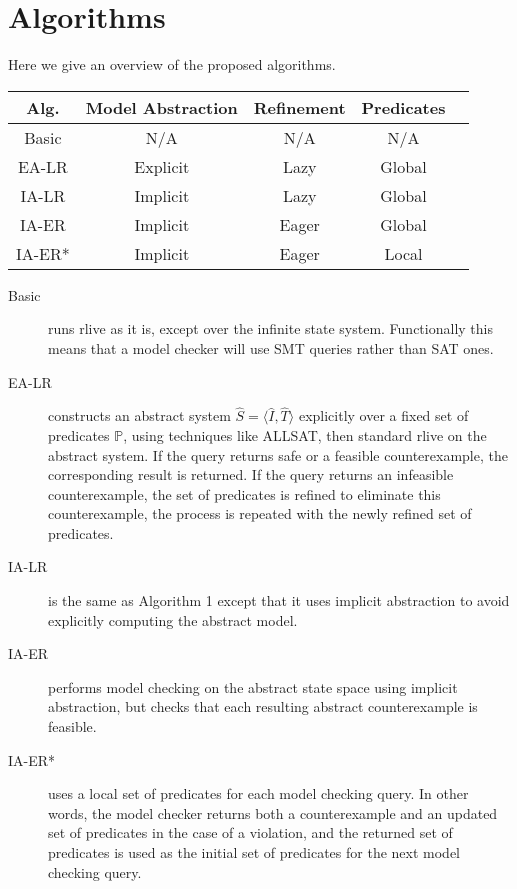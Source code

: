 \documentclass[runningheads]{llncs}
\newcommand{\rlive}{\textsf{rlive}\xspace}
\newcommand{\abs}[1]{\ensuremath{\widehat{#1}}}
\newcommand{\preds}{\ensuremath{\mathbb{P}}}
\begin{document}
\section{Algorithms}

Here we give an overview of the proposed algorithms.

\begin{table}[h]
\centering
\begin{tabular}{|c|c|c|c|c|}
\hline
\textbf{Alg.} & \textbf{Model Abstraction} & \textbf{Refinement} & \textbf{Predicates} \\ 
\hline \hline
Basic         & N/A                        & N/A                 & N/A                 \\ \hline
EA-LR         & Explicit                   & Lazy                & Global              \\ \hline
IA-LR         & Implicit                   & Lazy                & Global              \\ \hline
IA-ER         & Implicit                   & Eager               & Global              \\ \hline
IA-ER*        & Implicit                   & Eager               & Local               \\ \hline
\end{tabular}
\end{table}

\begin{description}
    \item[Basic] runs \rlive as it is, except over the infinite state system. Functionally
    this means that a model checker will use SMT queries rather than SAT ones.

    \item[EA-LR] constructs an abstract system $\abs{S} = \langle \abs{I}, \abs{T} \rangle$
    explicitly over a fixed set of predicates $\preds$, using techniques like ALLSAT, then standard
    \rlive on the abstract system. If the query returns safe or a feasible counterexample, the
    corresponding result is returned. If the query returns an infeasible counterexample, the set of
    predicates is refined to eliminate this counterexample, the process is repeated with the newly
    refined set of predicates.

    \item[IA-LR] is the same as Algorithm 1 except that it uses implicit abstraction to
    avoid explicitly computing the abstract model.
    
    \item[IA-ER] performs model checking on the abstract state space using implicit
    abstraction, but checks that each resulting abstract counterexample is feasible. 
    
    \item[IA-ER*] uses a local set of predicates for each model checking query. In other words,
    the model checker returns both a counterexample and an updated set of predicates in the case of
    a violation, and the returned set of predicates is used as the initial set of predicates for the
    next model checking query. 
\end{description}
\end{document}
